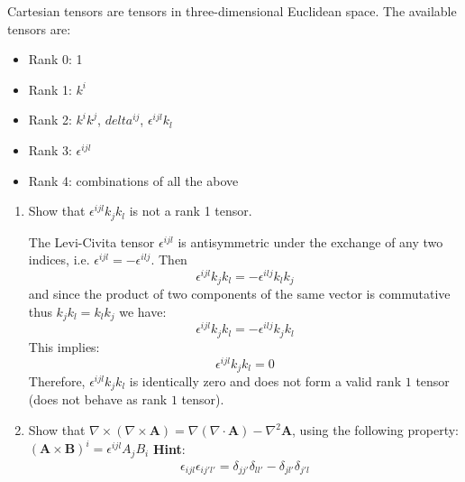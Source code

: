 Cartesian tensors are tensors in three-dimensional Euclidean space. The available tensors are: \begin{itemize}
    \item Rank 0: 1
    \item Rank 1: $k^i$
    \item Rank 2: $k^i k^j$, $delta^{ij}$, $\epsilon^{ijl} k_l$
    \item Rank 3: $\epsilon^{ijl}$
    \item Rank 4: combinations of all the above
\end{itemize}

\begin{enumerate}
    \item  Show that $\epsilon^{ijl} k_j k_l$ is not a rank 1 tensor.

          \begin{solution}
              The Levi-Civita tensor $\epsilon^{ijl}$ is antisymmetric under the exchange of any two indices, i.e. $\epsilon^{ijl} = -\epsilon^{ilj}$. Then
              $$\epsilon^{ijl} k_j k_l = -\epsilon^{ilj} k_l k_j$$ and since the product of two components of the same vector is commutative thus $k_j k_l = k_l k_j$  we have:
              $$\epsilon^{ijl} k_j k_l = -\epsilon^{ilj} k_j k_l$$
              This implies:
              $$\epsilon^{ijl} k_j k_l = 0$$
              Therefore, $\epsilon^{ijl}k_jk_l $ is identically zero and does not form a valid rank $1$   tensor (does not behave as rank $1$ tensor).
          \end{solution}

    \item  Show that $\nabla \times (\nabla \times \mathbf{A}) = \nabla (\nabla \cdot \mathbf{A}) - \nabla^2 \mathbf{A}$, using the following property: $(\mathbf{A} \times \mathbf{B})^i = \epsilon^{ijl} A_{j}B_{i}$
          \textbf{Hint}:
          \begin{align}
              \epsilon_{ijl} \epsilon_{ij'l'} = \delta_{jj'} \delta_{ll'}- \delta_{jl'}\delta_{j'l}
          \end{align}


\end{enumerate}
